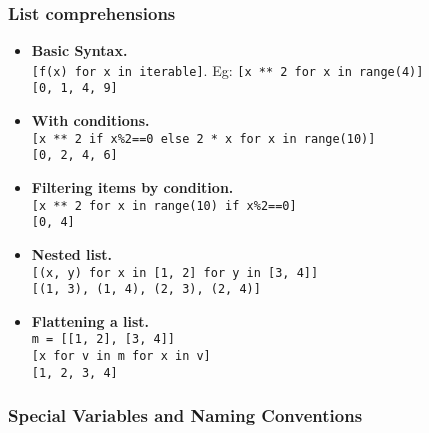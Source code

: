 \subsubsection{List comprehensions}
\begin{itemize}
\item \textbf{Basic Syntax.}\\
            \texttt{[f(x) for x in iterable]}.
            Eg: \texttt{[x ** 2 for x in range(4)]}\\
            \texttt{[0, 1, 4, 9]}
\item \textbf{With conditions.}\\ 
            \texttt{[x ** 2 if x\%2==0 else 2 * x for x in range(10)]}\\
            \texttt{[0, 2, 4, 6]}
\item \textbf{Filtering items by condition.}\\
            \texttt{[x ** 2 for x in range(10) if x\%2==0]}\\
            \texttt{[0, 4]}
\item \textbf{Nested list.}\\
            \texttt{[(x, y) for x in [1, 2] for y in [3, 4]]}\\
            \texttt{[(1, 3), (1, 4), (2, 3), (2, 4)]}
\item \textbf{Flattening a list.}\\
            \texttt{m = [[1, 2], [3, 4]]}\\
            \texttt{[x for v in m for x in v]}\\
            \texttt{[1, 2, 3, 4]}
\end{itemize}



\subsubsection{Special Variables and Naming Conventions}

